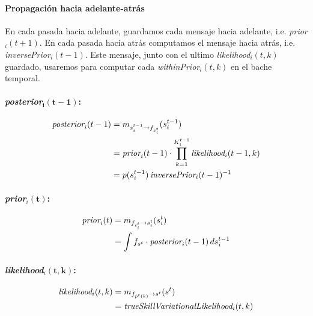 \documentclass[11pt,twoside, spanish]{report} %
\begin{document}
\paragraph{Propagaci\'on hacia adelante-atr\'as}
En cada pasada hacia adelante, guardamos cada mensaje hacia adelante, i.e. \emph{prior}$_i(t+1)$.
En cada pasada hacia atr\'as computamos el mensaje hacia atr\'as, i.e. \emph{inversePrior}$_i(t-1)$.
Este mensaje, junto con el ultimo \emph{likelihood}$_i(t,k)$ guardado, usaremos para computar cada \emph{withinPrior}$_i(t,k)$ en el bache temporal.
\vspace{0.3cm}

\paragraph{\emph{posterior}$\bm{_i(t-1)}$:}

\begin{equation}
\begin{split}
\emph{posterior}_i(t-1)&= m_{s_i^{t-1}\rightarrow f_{s_i^t}}(s_i^{t-1}) \\
&= \emph{prior}_i(t-1) \cdot \prod_{k=1}^{K_i^{t-1}} \emph{likelihood}_i(t-1,k)\\
&= p(s_i^{t-1}) \, \emph{inversePrior}_i(t-1)^{-1}
\end{split}
\end{equation}


\paragraph{\emph{prior}$_i\bm{(t)}$:}

\begin{equation}
\begin{split}
\emph{prior}_i(t) &= m_{f_{s_i^t} \rightarrow s_i^t}(s_i^t) \\
&= \int f_{s^t} \cdot \emph{posterior}_i(t-1) \, ds_i^{t-1}
\end{split}
\end{equation}

\paragraph{\emph{likelihood}$_i\bm{(t,k)}$:}

\begin{equation}
\begin{split}
\emph{likelihood}_i(t,k) &= m_{f_{p^{t}(k)} \rightarrow s^t}(s^t) \\
&= \emph{trueSkillVariationalLikelihood}_i(t,k)
\end{split}
\end{equation}
\end{document}
